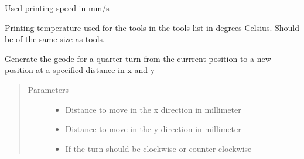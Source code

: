 \documentclass[letterpaper,10pt,english]{sphinxmanual}
\begin{document}
\begin{fulllineitems}
\begin{fulllineitems}
\label{\detokenize{index:generator.generator.print_speed}}
\sphinxAtStartPar
Used printing speed in mm/s

\end{fulllineitems}


\begin{fulllineitems}
\label{\detokenize{index:generator.generator.printing_temperatures}}
\sphinxAtStartPar
Printing temperature used for the tools in the tools list in degrees Celsius. Should be of the same size as tools.

\end{fulllineitems}


\begin{fulllineitems}
\label{\detokenize{index:generator.generator.quarter_turn}}
\sphinxAtStartPar
Generate the gcode for a quarter turn from the currrent position to a new position at a specified distance in x and y
\begin{quote}\begin{description}
\item[{Parameters}] \leavevmode\begin{itemize}
\item {} 
\sphinxAtStartPar
{} \textendash{} Distance to move in the x direction in millimeter

\item {} 
\sphinxAtStartPar
{} \textendash{} Distance to move in the y direction in millimeter

\item {} 
\sphinxAtStartPar
{} \textendash{} If the turn should be clockwise or counter clockwise


\end{itemize}
\end{description}
\end{quote}
\end{fulllineitems}
\end{fulllineitems}
\end{document}
